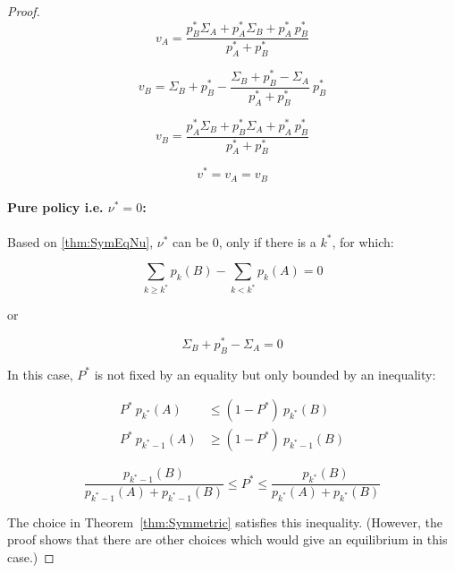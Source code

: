 \documentclass{article}
\theoremstyle{definition}
\begin{document}
\begin{proof}
\begin{equation}
    v_A = \frac{p^*_B \Sigma_A + p^*_A \Sigma_B + p^*_A \ p^*_B}{p^*_A + p^*_B} 
\end{equation}

\begin{equation}
    v_B = \Sigma_B + p^*_B - \frac{\Sigma_B + p^*_B - \Sigma_A}{p^*_A + p^*_B} \ p^*_B
\end{equation}

\begin{equation}
    v_B = \frac{p^*_A \Sigma_B + p^*_B \Sigma_A + p^*_A \ p^*_B}{p^*_A + p^*_B}
\end{equation}

\begin{equation}
    v^* = v_A = v_B
\end{equation}


\paragraph{Pure policy i.e. $\nu^*=0$:}

Based on \ref{thm:SymEqNu}, $\nu^*$ can be $0$, only if there is a $k^*$, for which:

\begin{equation}
    \sum_{k \geq k^*} p_k(B) - \sum_{k < k^*} p_k(A) = 0
\end{equation}

or 

\begin{equation}
    \label{proof:SymEqnu=0}
    \Sigma_B + p^*_B - \Sigma_A = 0
\end{equation}


In this case, $P^*$ is not fixed by an equality but only bounded by an inequality:

\begin{equation}
    \begin{split}
    P^* \ p_{k^*}(A)   &\le (1-P^*) \ p_{k^*}(B) \\
    P^* \ p_{k^*-1}(A) &\ge (1-P^*) \ p_{k^*-1}(B)
    \end{split}
\end{equation}

\begin{equation}
    \frac{p_{k^*-1}(B)}{p_{k^*-1}(A)+p_{k^*-1}(B)} \le P^* \le \frac{p_{k^*}(B)}{p_{k^*}(A)+p_{k^*}(B)}
\end{equation}

The choice in Theorem~\ref{thm:Symmetric} satisfies this inequality. (However, the proof shows that there are other choices which would give an equilibrium in this case.)


\end{proof}
\end{document}
